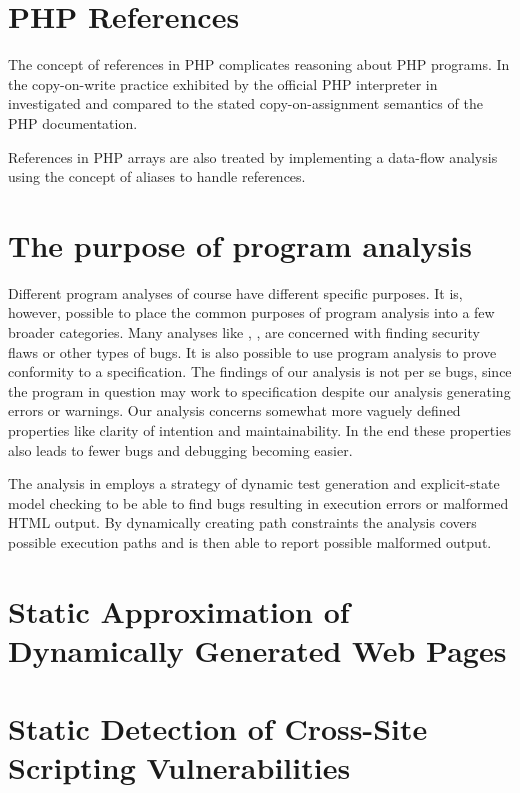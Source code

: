 \section{PHP References}
The concept of references in PHP complicates reasoning about PHP programs. In  the copy-on-write practice exhibited by the official PHP interpreter in investigated and compared to the stated copy-on-assignment semantics of the PHP documentation.

References in PHP arrays are also treated by  implementing a data-flow analysis using the concept of aliases to handle references. 

\section{The purpose of program analysis}
Different program analyses of course have different specific purposes. It is, however, possible to place the common purposes of program analysis into a few broader categories. Many analyses like , , are concerned with finding security flaws or other types of bugs. It is also possible to use program analysis to prove conformity to a specification. The findings of our analysis is not per se bugs, since the program in question may work to specification despite our analysis generating errors or warnings. Our analysis concerns somewhat more vaguely defined properties like clarity of intention and maintainability. In the end these properties also leads to fewer bugs and debugging becoming easier.

The analysis in  employs a strategy of dynamic test generation and explicit-state model checking to be able to find bugs resulting in execution errors or malformed HTML output. By dynamically creating path constraints the analysis covers possible execution paths and is then able to report possible malformed output. 

\section{Static Approximation of Dynamically Generated Web Pages}

\section{Static Detection of Cross-Site Scripting Vulnerabilities}

